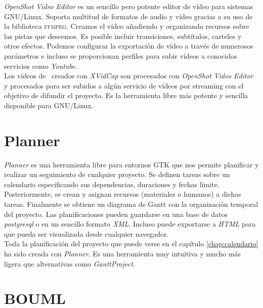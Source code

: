 \textit{OpenShot Video Editor} \cite{website:openshot} es un sencillo pero
potente editor de vídeo para sistemas GNU/Linux. Soporta multitud de formatos
de audio y vídeo gracias a su uso de la biblioteca \textsc{ffmpeg}. Creamos
el vídeo añadiendo y organizando recursos sobre las pistas que deseemos.
Es posible incluir transiciones, subtítulos, carteles y otros efectos.
Podemos configurar la exportación de vídeo a través de numerosos parámetros
e incluso se proporcionan perfiles para subir vídeos a conocidos servicios
como \textit{Youtube}.\\

Los vídeos de \juego\ creados con \textit{XVidCap} son procesados con
\textit{OpenShot Video Editor} y procesados para ser subidos a algún
servicio de vídeos por streaming con el objetivo de difundir el proyecto.
Es la herramienta libre más potente y sencilla disponible para GNU/Linux.\\


\section*{Planner}

\textit{Planner} \cite{website:planner} es una herramienta libre para entornos
GTK que nos permite planificar y realizar un seguimiento de cualquier proyecto.
Se definen tareas sobre un calendario especificando sus dependencias, duraciones
y fechas límite. Posteriormente, se crean y asignan recursos (materiales
o humanos) a dichas tareas. Finalmente se obtiene un diagrama de Gantt con
la organización temporal del proyecto. Las planificaciones pueden guardarse
en una base de datos \textit{postgresql} o en un sencillo formato \textit{XML}.
Incluso puede exportarse a \textit{HTML} para que pueda ser visualizada
desde cualquier navegador.\\

Toda la planificación del proyecto que puede verse en el capítulo
\ref{chap:calendario} ha sido creada con \textit{Planner}. Es una herramienta
muy intuitiva y mucho más ligera que alternativas como \textit{GanttProject}.\\


\section*{BOUML}

